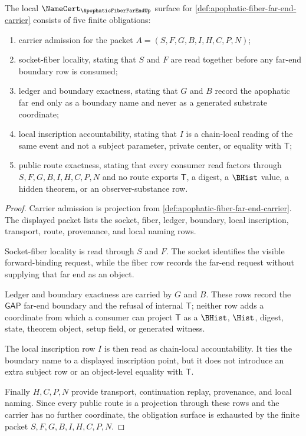 \begin{theorem}
\label{thm:apophatic-fiber-far-end-namecert-obligations}
The local $\NameCert_{\ApophaticFiberFarEndUp}$ surface for \autoref{def:apophatic-fiber-far-end-carrier} consists of five finite obligations:
\begin{enumerate}
\item carrier admission for the packet $A=(S,F,G,B,I,H,C,P,N)$;
\item socket-fiber locality, stating that $S$ and $F$ are read together before any far-end boundary row is consumed;
\item ledger and boundary exactness, stating that $G$ and $B$ record the apophatic far end only as a boundary name and never as a generated substrate coordinate;
\item local inscription accountability, stating that $I$ is a chain-local reading of the same event and not a subject parameter, private center, or equality with $\mathsf{T}$;
\item public route exactness, stating that every consumer read factors through $S,F,G,B,I,H,C,P,N$ and no route exports $\mathsf{T}$, a digest, a $\BHist$ value, a hidden theorem, or an observer-substance row.
\end{enumerate}
\end{theorem}
\begin{proof}
Carrier admission is projection from \autoref{def:apophatic-fiber-far-end-carrier}. The displayed packet lists the socket, fiber, ledger, boundary, local inscription, transport, route, provenance, and local naming rows.

Socket-fiber locality is read through $S$ and $F$. The socket identifies the visible forward-binding request, while the fiber row records the far-end request without supplying that far end as an object.

Ledger and boundary exactness are carried by $G$ and $B$. These rows record the $\mathsf{GAP}$ far-end boundary and the refusal of internal $\mathsf{T}$; neither row adds a coordinate from which a consumer can project $\mathsf{T}$ as a $\BHist$, $\Hist$, digest, state, theorem object, setup field, or generated witness.

The local inscription row $I$ is then read as chain-local accountability. It ties the boundary name to a displayed inscription point, but it does not introduce an extra subject row or an object-level equality with $\mathsf{T}$.

Finally $H,C,P,N$ provide transport, continuation replay, provenance, and local naming. Since every public route is a projection through these rows and the carrier has no further coordinate, the obligation surface is exhausted by the finite packet $S,F,G,B,I,H,C,P,N$.
\end{proof}

